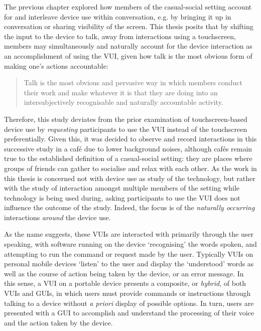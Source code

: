 \begin{revisedsubmission}
\begin{quote}
\end{quote}
The previous chapter explored how members of the casual-social setting account for and interleave device use within conversation, e.g. by bringing it up in conversation or sharing visibility of the screen.
This thesis posits that by shifting the input to the device to talk, away from interactions using a touchscreen, members may simultaneously and naturally account for the device interaction as an accomplishment of using the \ac{VUI}, given how talk is the most obvious form of making one's actions accountable:
\begin{quote}
    Talk is the most obvious and pervasive way in which members conduct their work and make whatever it is that they are doing into an intersubjectively recognisable and naturally accountable activity.
\end{quote}
Therefore, this study deviates from the prior examination of touch\-screen-based device use by \textit{requesting} participants to use the \ac{VUI} instead of the touchscreen preferentially.
Given this, it was decided to observe and record interactions in this successive study in a caf\'{e} due to lower background noises, although caf\'{e}s remain true to the established definition of a casual-social setting: they are places where groups of friends can gather to socialise and relax with each other.
As the work in this thesis is concerned not with device use as study of the technology, but rather with the study of interaction amongst multiple members of the setting while technology is being used during, asking participants to use the \ac{VUI} does not influence the outcome of the study.
Indeed, the focus is of the \textit{naturally occurring} interactions \textit{around} the device use.
\end{revisedsubmission}

As the name suggests, these \acp{VUI} are interacted with primarily through the user speaking, with software running on the device `recognising' the words spoken, and attempting to run the command or request made by the user.
Typically \acp{VUI} on personal mobile devices `listen' to the user and display the `understood' words as well as the course of action being taken by the device, or an error message.
In this sense, a \ac{VUI} on a portable device presents a composite, or \textit{hybrid}, of both \acp{VUI} and \acp{GUI}, in which users must provide commands or instructions through talking to a device without \textit{a priori} display of possible options.
In turn, users are presented with a \ac{GUI} to accomplish and understand the processing of their voice and the action taken by the device.

